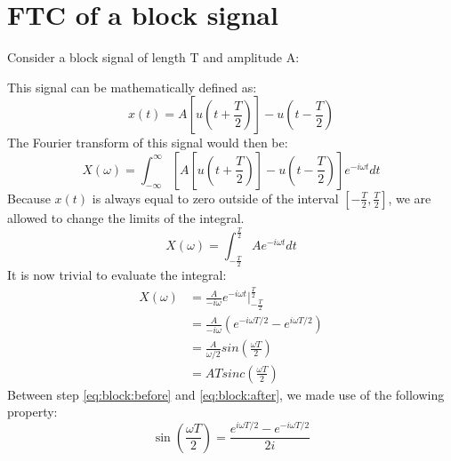 \documentclass[]{subfiles}
\begin{document}
	\section{FTC of a block signal}
	Consider a block signal of length T and amplitude A:\\

	\begin{figure}[h]
		\centering
	\end{figure}
	This signal can be mathematically defined as:
	\begin{equation}
		x(t) = A\left[ u(t+\frac{T}{2})\right] -u(t-\frac{T}{2})
	\end{equation}
	The Fourier transform of this signal would then be:
	\begin{equation}
		X(\omega) = \int_{-\infty}^{\infty}\left[ A\left[ u(t+\frac{T}{2})\right] -u(t-\frac{T}{2})\right] e^{-i\omega t}dt
	\end{equation}
	Because $x(t)$ is always equal to zero outside of the interval $\left[ -\frac{T}{2},\frac{T}{2}\right] $, we are allowed to change the limits of the integral.
	\begin{equation}
		X(\omega) = \int_{-\frac{T}{2}}^{\frac{T}{2}}A e^{-i\omega t}dt
	\end{equation}
	It is now trivial to evaluate the integral:
	\begin{align}
		X(\omega)&=\frac{A}{-i\omega}e^{-i\omega t} \bigg\vert_{-\frac{T}{2}}^{\frac{T}{2}}\\
		\label{eq:block:before}
		&= \frac{A}{-i\omega}(e^{-i\omega T/2}-e^{i\omega T/2})\\
		\label{eq:block:after}
		&= \frac{A}{\omega/2}sin(\frac{\omega T}{2})\\
		&=ATsinc(\frac{\omega T}{2})
	\end{align}
	Between step \ref{eq:block:before} and \ref{eq:block:after}, we made use of the following property:
	\begin{equation}
		\sin(\frac{\omega T}{2}) = \frac{e^{i\omega T/2}-e^{-i\omega T/2}}{2i}
	\end{equation}
\end{document}
